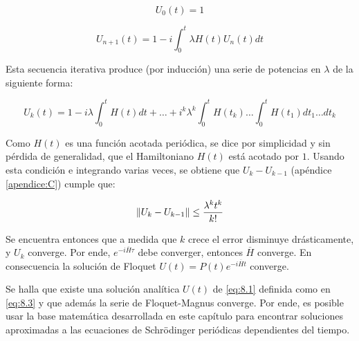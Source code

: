 \begin{equation}\label{eq:8.12}
    U_0(t)=1
\end{equation}

\begin{equation}\label{eq:8.13}
    U_{n+1}(t)=1-i\int^{t}_0 \lambda H(t)U_n(t)dt
\end{equation}

Esta secuencia iterativa produce (por inducción) una serie de potencias en $\lambda$ de la siguiente forma:

\begin{equation}\label{eq:8.14}
    U_k(t)=1-i\lambda\int^{t}_0H(t)dt+\dots +i^k\lambda^k\int^{t}_0H(t_k)\dots \int^{t}_0H(t_1)dt_1 \dots dt_k
\end{equation}

Como $H(t)$ es una función acotada periódica, se dice por simplicidad y sin pérdida de generalidad, que el Hamiltoniano $H(t)$ está acotado por $1$. Usando esta condición e integrando varias veces, se obtiene que  $U_k-U_{k-1}$ (apéndice \ref{apendice:C}) cumple que: 

\begin{equation}\label{eq:8.15}
    \norm{U_k-U_{k-1}}\leq \frac{\lambda^kt^k}{k!}
\end{equation}

Se encuentra entonces que a medida que $k$ crece el error disminuye drásticamente, y $U_k$ converge. Por ende, $e^{-i\overline{H}\tau}$ debe converger, entonces $\overline{H}$ converge. En consecuencia la solución de Floquet  $U(t)=P(t)e^{-i\overline{H}t}$ converge. 

Se halla que existe una solución analítica $U(t)$ de \ref{eq:8.1} definida como en \ref{eq:8.3} y que además la serie de Floquet-Magnus converge. Por ende, es posible usar la base matemática desarrollada en este capítulo para encontrar soluciones aproximadas a las ecuaciones de Schrödinger periódicas dependientes del tiempo. 